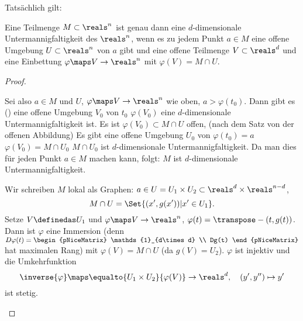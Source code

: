 Tatsächlich gilt:
\begin{satz}\label{mannigfaltigkeiten_sind_parametisierbar}
  Eine Teilmenge \( M\subset \reals^n \) ist genau dann eine \( d \)-dimensionale Untermannigfaltigkeit des \( \reals^n \), wenn es zu jedem Punkt \( a\in M \) eine offene Umgebung \( U\subset \reals^n \) von \( a \) gibt und eine offene Teilmenge \( V\subset \reals^d \) und eine Einbettung \( \varphi\maps V\to \reals^n \) mit \( \varphi(V)=M\cap U \).
\end{satz}
\begin{proof}
  \begin{proofdescription}
    \item[\rueck] Sei also \( a\in M \) und \( U \), \( \varphi\maps V\to \reals^n \) wie oben, \( a>\varphi(t_0) \). Dann gibt es () eine offene Umgebung \( V_0 \) von \( t_0 \) \sd \( \varphi(V_0) \) eine \( d \)-dimensionale Untermannigfaltigkeit ist. Es ist \( \varphi(V_0)\subset M\cap U \) offen, (nach dem Satz von der offenen Abbildung) \timplies Es gibt eine offene Umgebung \( U_0 \) von \( \varphi(t_0)=a \) \sd \( \varphi(V_0)=M\cap U_0 \) \timplies \( M\cap U_0 \) ist \( d \)-dimensionale Untermannigfaltigkeit. Da man dies für jeden Punkt \( a\in M \) machen kann, folgt: \( M \) ist \( d \)-dimensionale Untermannigfaltigkeit.
    \item[\hin] Wir schreiben \( M \) lokal als Graphen: \( a\in U=U_1\times U_2\subset \reals^d\times\reals^{n-d} \),   
    \begin{equation*}
      M\cap U=\Set{(x',g(x'))|x'\in U_1}.
    \end{equation*}
    Setze \( V\definedas U_1 \) und \( \varphi\maps V\to \reals^n \), \( \varphi(t)=\transpose-{(t,g(t))} \). Dann ist \( \varphi \) eine Immersion (denn \( D\varphi(t)=\begin{pNiceMatrix} \mathds{1}_{d\times d} \\ Dg(t) \end{pNiceMatrix} \) hat maximalen Rang) mit \( \varphi(V)=M\cap U \) (da \( g(V)=U_2 \)). \( \varphi \) ist injektiv und die Umkehrfunktion
      \begin{equation*}
        \inverse{\varphi}\maps \equalto{U_1\times U_2}{\varphi(V)}\to \reals^d,\quad (y',y'')\mapsto y'
      \end{equation*}
      ist stetig.
  \end{proofdescription}
  
\end{proof}
